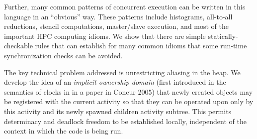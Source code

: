 Further, many common patterns of concurrent execution can be written
in this language in an ``obvious'' way. These patterns include
histograms, all-to-all reductions, stencil computations, master/slave
execution, and most of the important HPC computing idioms. We show
that there are simple statically-checkable rules that can establish
for many common idioms that some run-time synchronization checks can
be avoided.

The key technical problem addressed is unrestricting aliasing in the
heap.  We develop the idea of an {\em implicit ownership domain}
(first introduced in the semantics of clocks in \Xten{} in a paper in
Concur 2005) that newly created objects may be registered with the
current activity so that they can be operated upon only by this
activity and its newly spawned children activity subtree.  This
permits determinacy and deadlock freedom to be established locally,
independent of the context in which the code is being run.


